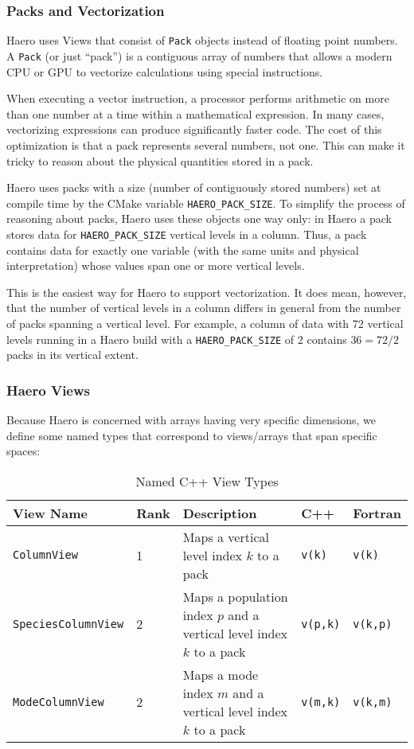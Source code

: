 \subsubsection*{Packs and Vectorization}

Haero uses Views that consist of \texttt{Pack} objects instead of floating
point numbers. A \texttt{Pack} (or just ``pack'') is a contiguous array of numbers
that allows a modern CPU or GPU to vectorize calculations using special
instructions.

When executing a vector instruction, a processor performs arithmetic on more
than one number at a time within a mathematical expression. In many cases,
vectorizing expressions can produce significantly faster code. The cost of this
optimization is that a pack represents several numbers, not one. This can make
it tricky to reason about the physical quantities stored in a pack.

Haero uses packs with a size (number of contiguously stored numbers) set at
compile time by the CMake variable \texttt{HAERO\_PACK\_SIZE}. To simplify the
process of reasoning about packs, Haero uses these objects one way only:
in Haero a pack stores data for \texttt{HAERO\_PACK\_SIZE} vertical levels in
a column. Thus, a pack contains data for exactly one variable (with the same
units and physical interpretation) whose values span one or more vertical
levels.

This is the easiest way for Haero to support vectorization. It does mean,
however, that the number of vertical levels in a column differs in general from
the number of packs spanning a vertical level. For example, a column of data
with 72 vertical levels running in a Haero build with a \texttt{HAERO\_PACK\_SIZE}
of 2 contains $36 = 72 / 2 $ packs in its vertical extent.

\subsubsection*{Haero Views}

Because Haero is concerned with arrays having very specific dimensions, we
define some named types that correspond to views/arrays that span specific
spaces:

\begin{table}[htbp]
\centering
\caption{Named C++ View Types}
\label{tab:viewtypes}
\begin{tabular}{|l|l|p{6cm}|l|l|}
  \toprule
  View Name & Rank & Description & C++ & Fortran \\
  \midrule
  \texttt{ColumnView} & 1 & Maps a vertical level index $k$ to a pack & \texttt{v(k)} & \texttt{v(k)} \\
  \texttt{SpeciesColumnView} & 2 & Maps a population index $p$ and a vertical level index $k$ to a pack & \texttt{v(p,k)}  & \texttt{v(k,p)} \\
  \texttt{ModeColumnView} & 2 & Maps a mode index $m$ and a vertical level index $k$ to a pack & \texttt{v(m,k)}  & \texttt{v(k,m)} \\
  \bottomrule
\end{tabular}
\end{table}

